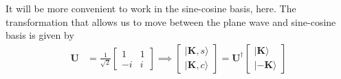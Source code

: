 It will be more convenient to work in the sine-cosine basis, here. The transformation that allows us to move between the plane wave and sine-cosine basis is given by
\begin{align}
\mathbf{U} &= \frac{1}{\sqrt{2}} \begin{bmatrix}
1 & 1 \\
 -i & i
\end{bmatrix}
\implies
\begin{bmatrix}|\mathbf{K},s \rangle \\
|\mathbf{K},c \rangle
\end{bmatrix} = \mathbf{U}^\dag \begin{bmatrix} |\mathbf{K} \rangle \\
|-\mathbf{K} \rangle
\end{bmatrix}
\end{align}
